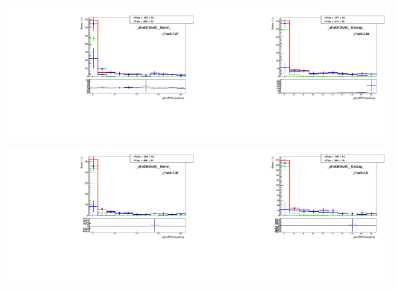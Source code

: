 \begin{figure}[htb]
  \begin{center}
   \includegraphics[width=0.45\textwidth]{../figs/figs_v11/ELECTRON_WGamma/TemplateFits/c_TEMPL_CHISO_UNblind__phoEt75to85__Barrel__RooFit.pdf}\includegraphics[width=0.45\textwidth]{../figs/figs_v11/ELECTRON_WGamma/TemplateFits/c_TEMPL_CHISO_UNblind__phoEt75to85__Endcap__RooFit.pdf}\\
   \includegraphics[width=0.45\textwidth]{../figs/figs_v11/ELECTRON_WGamma/TemplateFits/c_TEMPL_CHISO_UNblind__phoEt85to95__Barrel__RooFit.pdf}\includegraphics[width=0.45\textwidth]{../figs/figs_v11/ELECTRON_WGamma/TemplateFits/c_TEMPL_CHISO_UNblind__phoEt85to95__Endcap__RooFit.pdf}\\

\end{center}
\end{figure}
